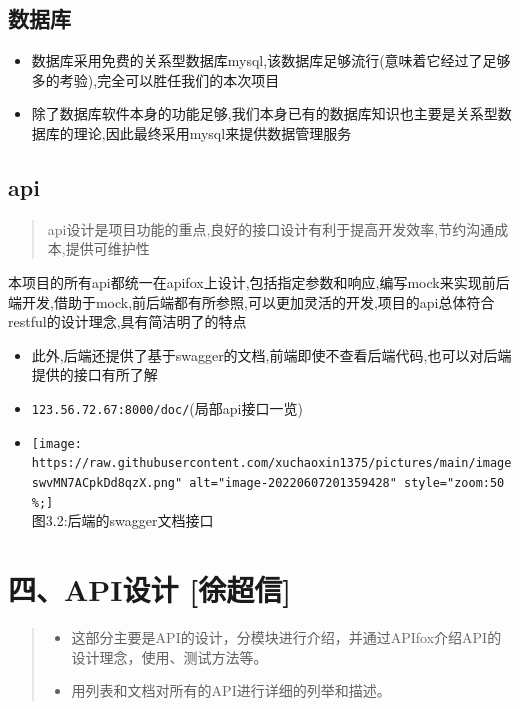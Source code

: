 \documentclass[
]{article}
\begin{document}
\hypertarget{ux6570ux636eux5e93}{%
\subsection{数据库}\label{ux6570ux636eux5e93}}

\begin{itemize}
\item
  数据库采用免费的关系型数据库mysql,该数据库足够流行(意味着它经过了足够多的考验),完全可以胜任我们的本次项目
\item
  除了数据库软件本身的功能足够,我们本身已有的数据库知识也主要是关系型数据库的理论,因此最终采用mysql来提供数据管理服务
\end{itemize}

\hypertarget{api}{%
\subsection{api}\label{api}}

\begin{quote}
api设计是项目功能的重点,良好的接口设计有利于提高开发效率,节约沟通成本,提供可维护性
\end{quote}

本项目的所有api都统一在apifox上设计,包括指定参数和响应,编写mock来实现前后端开发,借助于mock,前后端都有所参照,可以更加灵活的开发,项目的api总体符合restful的设计理念,具有简洁明了的特点

\begin{itemize}
\item
  此外,后端还提供了基于swagger的文档,前端即使不查看后端代码,也可以对后端提供的接口有所了解
\item
  \texttt{123.56.72.67:8000/doc/}(局部api接口一览)
\item
  \texttt{[image: https://raw.githubusercontent.com/xuchaoxin1375/pictures/main/imageswvMN7ACpkDd8qzX.png" alt="image-20220607201359428" style="zoom:50\\\%;]}\\
  图3.2:后端的swagger文档接口
\end{itemize}

\hypertarget{ux56dbapiux8bbeux8ba1-ux5f90ux8d85ux4fe1}{%
\section{四、API设计
{[}徐超信{]}}\label{ux56dbapiux8bbeux8ba1-ux5f90ux8d85ux4fe1}}

\begin{quote}
\begin{itemize}
\item
  这部分主要是API的设计，分模块进行介绍，并通过APIfox介绍API的设计理念，使用、测试方法等。
\item
  用列表和文档对所有的API进行详细的列举和描述。
\end{itemize}
\end{quote}
\end{document}
